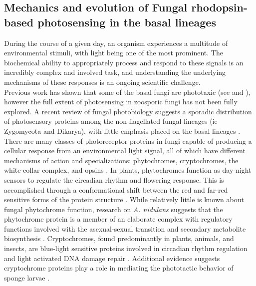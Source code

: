 \subsection*{Mechanics and evolution of Fungal rhodopsin-based photosensing in the basal lineages}
\indent During the course of a given day, an organism experiences a
multitude of environmental stimuli, with light being one of the most
prominent. The biochemical ability to appropriately process and
respond to these signals is an incredibly complex and involved task,
and understanding the underlying mechanisms of these responses is an
ongoing scientific challenge. \\
\indent Previous work has shown that some of the basal fungi are
phototaxic (see \cite{Saranak1997} and \cite{Muehlstein1987}), however
the full extent of photosensing in zoosporic fungi has not been fully
explored. A recent review of fungal photobiology suggests a sporadic
distribution of photosensory proteins among the non-flagellated fungal
lineages (ie Zygomycota and Dikarya), with little emphasis placed on
the basal lineages \cite{Idnurm2010}. There are many classes of
photoreceptor proteins in fungi capable of producing a cellular
response from an environmental light signal, all of which have
different mechanisms of action and specializations: phytochromes,
cryptochromes, the white-collar complex, and opsins
\cite{Idnurm2010}. In plants, phytochromes function as day-night
sensors to regulate the circadian rhythm and flowering response. This
is accomplished through a conformational shift between the red and
far-red sensitive forms of the protein structure
\cite{Rockwell2006}. While relatively little is known about fungal
phytochrome function, research on \textit{A. nidulans} suggests that
the phytochrome protein is a member of an elaborate complex with
regulatory functions involved with the asexual-sexual transition and
secondary metabolite biosynthesis \cite{Idnurm2010}. Cryptochromes,
found predominantly in plants, animals, and insects, are blue-light
sensitive proteins involved in circadian rhythm regulation and light
activated DNA damage repair \cite{Idnurm2010}. Additional evidence
suggests cryptochrome proteins play a role in mediating the
phototactic behavior of sponge larvae \cite{Rivera2012}.\\

